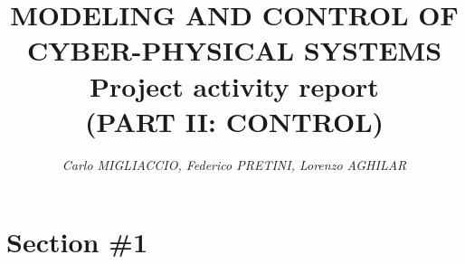 \documentclass[a4paper, 12pt]{article}
\begin{document}
    
    \title{
        \vspace{-2cm}
        \textbf{
        {\large{MODELING AND CONTROL OF CYBER-PHYSICAL SYSTEMS}}\\
        {\huge{Project activity report}}\\
        \normalsize{(PART II: CONTROL)}
        }
    }
    
    \author{
        \textit{    
        Carlo MIGLIACCIO, 
        Federico PRETINI, Lorenzo AGHILAR}
    }
    
    \clearpage\maketitle
    \thispagestyle{empty}

    

    \section*{Section \#1}
\end{document}
